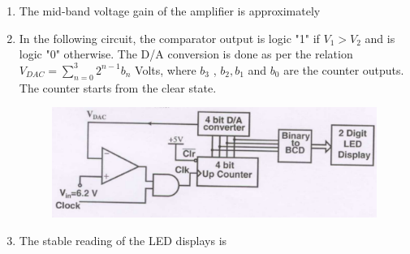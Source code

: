 \documentclass[a4paper, 11pt]{article}
\begin{document}
\begin{enumerate}
    \hfill{}
    
    \item The mid-band voltage gain of the amplifier is approximately
    \begin{enumerate}
    \end{enumerate}

    \hfill{}
    
    \item[] In the following circuit, the comparator output is logic "1" if $V_1 > V_2$ and is logic "0" otherwise. The D/A conversion is done as per the relation $V_{DAC} = \sum_{n=0}^{3} 2^{n-1}b_n$ Volts, where $b_3$ , $b_2, b_1$ and $b_0$  are the counter outputs. The counter starts from the clear state.
    \begin{figure}[H]
        \centering
        \includegraphics[width=\columnwidth]{q82}
        \caption*{}
        \label{fig:q82}
    \end{figure}
    
    \item The stable reading of the LED displays is
    \begin{enumerate}
    \end{enumerate}
    
    \hfill{}
    

\end{enumerate}
\end{document}
